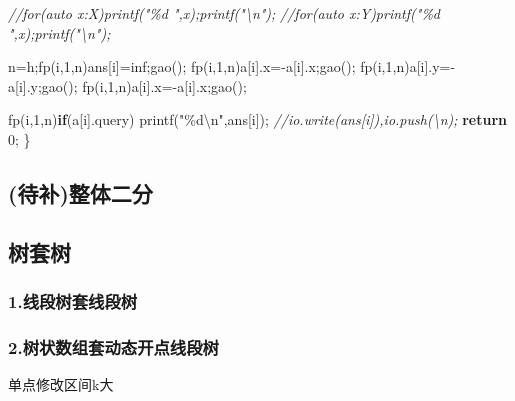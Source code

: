 \documentclass[
]{article}
\newenvironment{Shaded}{}{}
\newcommand{\CommentTok}[1]{\textcolor[rgb]{0.38,0.63,0.69}{\textit{#1}}}
\newcommand{\ControlFlowTok}[1]{\textcolor[rgb]{0.00,0.44,0.13}{\textbf{#1}}}
\newcommand{\DecValTok}[1]{\textcolor[rgb]{0.25,0.63,0.44}{#1}}
\newcommand{\NormalTok}[1]{#1}
\newcommand{\SpecialCharTok}[1]{\textcolor[rgb]{0.25,0.44,0.63}{#1}}
\newcommand{\StringTok}[1]{\textcolor[rgb]{0.25,0.44,0.63}{#1}}
\begin{document}
\begin{Shaded}
\begin{Highlighting}[]
    \CommentTok{//for(auto x:X)printf("\%d ",x);printf("\textbackslash{}n");}
    \CommentTok{//for(auto x:Y)printf("\%d ",x);printf("\textbackslash{}n");}
    
\NormalTok{    n=h;fp(i,}\DecValTok{1}\NormalTok{,n)ans[i]=inf;gao();}
\NormalTok{    fp(i,}\DecValTok{1}\NormalTok{,n)a[i].x={-}a[i].x;gao();}
\NormalTok{    fp(i,}\DecValTok{1}\NormalTok{,n)a[i].y={-}a[i].y;gao();}
\NormalTok{    fp(i,}\DecValTok{1}\NormalTok{,n)a[i].x={-}a[i].x;gao();}
    
\NormalTok{    fp(i,}\DecValTok{1}\NormalTok{,n)}\ControlFlowTok{if}\NormalTok{(a[i].query)}
\NormalTok{    printf(}\StringTok{"}\SpecialCharTok{\%d\textbackslash{}n}\StringTok{"}\NormalTok{,ans[i]);}
    \CommentTok{//io.write(ans[i]),io.push(\textquotesingle{}\textbackslash{}n\textquotesingle{});}
    \ControlFlowTok{return} \DecValTok{0}\NormalTok{;}
\NormalTok{\}}
\end{Highlighting}
\end{Shaded}

\hypertarget{ux5f85ux8865ux6574ux4f53ux4e8cux5206}{%
\subsection{(待补)整体二分}\label{ux5f85ux8865ux6574ux4f53ux4e8cux5206}}

\hypertarget{ux6811ux5957ux6811}{%
\subsection{树套树}\label{ux6811ux5957ux6811}}

\hypertarget{ux7ebfux6bb5ux6811ux5957ux7ebfux6bb5ux6811}{%
\subsubsection{1.线段树套线段树}\label{ux7ebfux6bb5ux6811ux5957ux7ebfux6bb5ux6811}}

\hypertarget{ux6811ux72b6ux6570ux7ec4ux5957ux52a8ux6001ux5f00ux70b9ux7ebfux6bb5ux6811}{%
\subsubsection{2.树状数组套动态开点线段树}\label{ux6811ux72b6ux6570ux7ec4ux5957ux52a8ux6001ux5f00ux70b9ux7ebfux6bb5ux6811}}

单点修改区间k大
\end{document}
